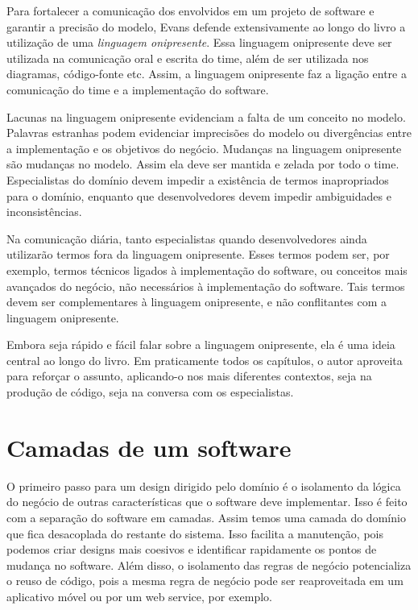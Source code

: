 \documentclass[a4paper, 12pt]{article}
\newcommand{\lgg}{linguagem onipresente\xspace}
\begin{document}
Para fortalecer a comunicação dos envolvidos em um projeto de software e garantir a precisão do modelo, Evans defende extensivamente ao longo do livro a utilização de uma \emph{linguagem onipresente}. Essa linguagem onipresente deve ser utilizada na comunicação oral e escrita do time, além de ser utilizada nos diagramas, código-fonte etc. Assim, a \lgg faz a ligação entre a comunicação do time e a implementação do software.

Lacunas na linguagem onipresente evidenciam a falta de um conceito no modelo. Palavras estranhas podem evidenciar imprecisões do modelo ou divergências entre a implementação e os objetivos do negócio. Mudanças na linguagem onipresente são mudanças no modelo. Assim ela deve ser mantida e zelada por todo o time. Especialistas do domínio devem impedir a existência de termos inapropriados para o domínio, enquanto que desenvolvedores devem impedir ambiguidades e inconsistências.

Na comunicação diária, tanto especialistas quando desenvolvedores ainda utilizarão termos fora da linguagem onipresente. Esses termos podem ser, por exemplo, termos técnicos ligados à implementação do software, ou conceitos mais avançados do negócio, não necessários à implementação do software. Tais termos devem ser complementares à linguagem onipresente, e não conflitantes com a linguagem onipresente.

Embora seja rápido e fácil falar sobre a \lgg, ela é uma ideia central ao longo do livro. Em praticamente todos os capítulos, o autor aproveita para reforçar o assunto, aplicando-o nos mais diferentes contextos, seja na produção de código, seja na conversa com os especialistas.


\section{Camadas de um software}

O primeiro passo para um design dirigido pelo domínio é o isolamento da lógica do negócio de outras características que o software deve implementar. Isso é feito com a separação do software em camadas. Assim temos uma camada do domínio que fica desacoplada do restante do sistema. Isso facilita a manutenção, pois podemos criar designs mais coesivos e identificar rapidamente os pontos de mudança no software. Além disso, o isolamento das regras de negócio potencializa o reuso de código, pois a mesma regra de negócio pode ser reaproveitada em um aplicativo móvel ou por um web service, por exemplo.
\end{document}
